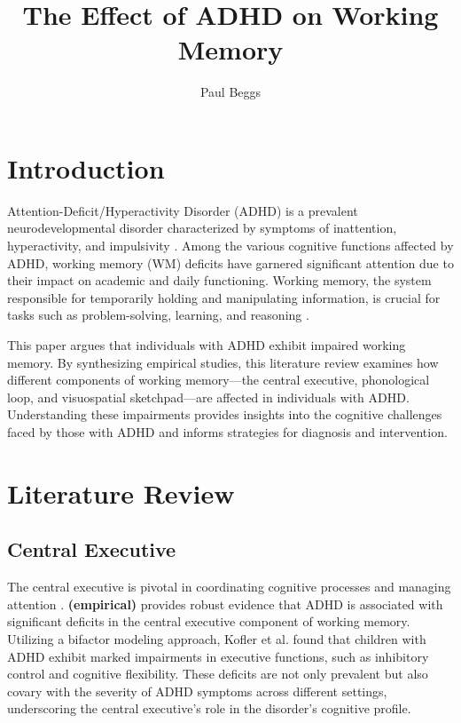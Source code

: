 \documentclass[stu]{apa7}
\title{The Effect of ADHD on Working Memory}
\author{Paul Beggs}
\begin{document}
\maketitle

\section{Introduction}

Attention-Deficit/Hyperactivity Disorder (ADHD) is a prevalent neurodevelopmental disorder characterized by symptoms of inattention, hyperactivity, and impulsivity \parencite{faraone_attention-deficithyperactivity_2015}. Among the various cognitive functions affected by ADHD, working memory (WM) deficits have garnered significant attention due to their impact on academic and daily functioning. Working memory, the system responsible for temporarily holding and manipulating information, is crucial for tasks such as problem-solving, learning, and reasoning \parencite{skalski_impact_2021}.

This paper argues that individuals with ADHD exhibit impaired working memory. By synthesizing empirical studies, this literature review examines how different components of working memory—the central executive, phonological loop, and visuospatial sketchpad—are affected in individuals with ADHD. Understanding these impairments provides insights into the cognitive challenges faced by those with ADHD and informs strategies for diagnosis and intervention.

\section{Literature Review}

\subsection{Central Executive}

The central executive is pivotal in coordinating cognitive processes and managing attention \parencite{kofler_are_2018}. \textcite{kofler_working_2020} \textbf{(empirical)} provides robust evidence that ADHD is associated with significant deficits in the central executive component of working memory. Utilizing a bifactor modeling approach, Kofler et al. found that children with ADHD exhibit marked impairments in executive functions, such as inhibitory control and cognitive flexibility. These deficits are not only prevalent but also covary with the severity of ADHD symptoms across different settings, underscoring the central executive's role in the disorder's cognitive profile.
\end{document}
